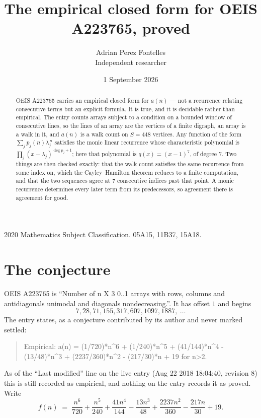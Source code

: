 \documentclass[11pt,a4paper]{article}
\title{The empirical closed form for OEIS A223765, proved}
\author{Adrian Perez Fontelles\\ \small Independent researcher}
\date{1 September 2026}
\theoremstyle{plain}
\theoremstyle{definition}
\begin{document}
\maketitle

\begin{abstract}
OEIS A223765 carries an empirical closed form for $a(n)$ --- not a recurrence relating
consecutive terms but an explicit formula. It is true, and it is decidable rather than
empirical. The entry counts arrays subject to a condition on a bounded window of consecutive lines, so the lines of an array are the
vertices of a finite digraph, an array is a walk in it, and $a(n)$ is a walk count on
$S=448$ vertices. Any function of the form $\sum_j p_j(n)\lambda_j^{\,n}$ satisfies the
monic linear recurrence whose characteristic polynomial is
$\prod_j(x-\lambda_j)^{\deg p_j+1}$; here that polynomial is $q(x)=(x-1)^{7}$, of degree
$7$. Two things are then checked exactly: that the walk count satisfies the same
recurrence from some index on, which the Cayley--Hamilton theorem reduces to a finite
computation, and that the two sequences agree at $7$ consecutive indices past that
point. A monic recurrence determines every later term from its predecessors, so agreement
there is agreement for good.
\end{abstract}

\noindent\small 2020 Mathematics Subject Classification. 05A15, 11B37, 15A18.\normalsize

\section{The conjecture}

OEIS A223765 is ``Number of n X 3 0..1 arrays with rows, columns and antidiagonals unimodal and diagonals nondecreasing.''. It has offset $1$ and begins
\[
7, 28, 71, 155, 317, 607, 1097, 1887,\ \dots
\]
The entry states, as a conjecture contributed by its author and never marked settled:
\begin{quote}
Empirical: a(n) = (1/720)*n\^{}6 + (1/240)*n\^{}5 + (41/144)*n\^{}4 - (13/48)*n\^{}3 + (2237/360)*n\^{}2 - (217/30)*n + 19 for n>2.
\end{quote}
As of the ``Last modified'' line on the live entry (Aug 22 2018 18:04:40, revision 8) this is still
recorded as empirical, and nothing on the entry records it as proved. Write
\[
f(n)\;=\;\frac{n^{6}}{720} + \frac{n^{5}}{240} + \frac{41 n^{4}}{144} - \frac{13 n^{3}}{48} + \frac{2237 n^{2}}{360} - \frac{217 n}{30} + 19.
\]
\end{document}
